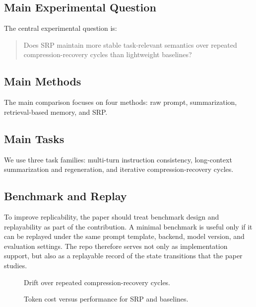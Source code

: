 \documentclass{article}
\begin{document}
\subsection{Main Experimental Question}

The central experimental question is:

\begin{quote}
Does SRP maintain more stable task-relevant semantics over repeated compression-recovery cycles than lightweight baselines?
\end{quote}

\subsection{Main Methods}

The main comparison focuses on four methods: raw prompt, summarization, retrieval-based memory, and SRP.

\subsection{Main Tasks}

We use three task families: multi-turn instruction consistency, long-context summarization and regeneration, and iterative compression-recovery cycles.

\subsection{Benchmark and Replay}

To improve replicability, the paper should treat benchmark design and replayability as part of the contribution. A minimal benchmark is useful only if it can be replayed under the same prompt template, backend, model version, and evaluation settings. The repo therefore serves not only as implementation support, but also as a replayable record of the state transitions that the paper studies.

\begin{figure}[t]
  \centering
  \caption{Drift over repeated compression-recovery cycles.}
  \label{fig:drift}
\end{figure}

\begin{figure}[t]
  \centering
  \caption{Token cost versus performance for SRP and baselines.}
  \label{fig:tradeoff}
\end{figure}
\end{document}
